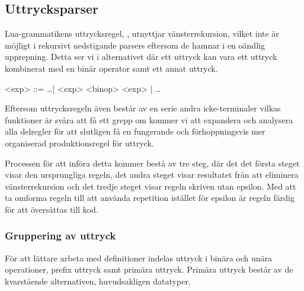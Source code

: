 \subsection{Uttrycksparser}

Lua-grammatikens uttrycksregel, , utnyttjar vänsterrekursion,
vilket inte är möjligt i rekursivt nedstigande parsers eftersom de hamnar i en
oändlig upprepning. Detta ser vi i alternativet där ett uttryck kan vara ett uttryck
kombinerat med en binär operator samt ett annat uttryck.


\setlength{\grammarindent}{5em}
\begin{grammar}
  \singlespace\small%
  \selectfont
  <exp> ::= \ldots | <exp> <binop> <exp> | \ldots
\end{grammar}

Eftersom uttrycksregeln även består av en serie andra icke-terminaler vilkas
funktioner är svåra att få ett grepp om kommer vi att expandera och analysera
alla delregler för att slutligen få en fungerande och förhoppningsvis mer
organiserad produktionsregel för uttryck.

Processen för att införa detta kommer bestå av tre steg, där det det första
steget visar den ursprungliga regeln, det andra steget visar resultatet från
att eliminera vänsterrekursion och det tredje steget visar regeln skriven utan epsilon.
Med att ta omforma regeln till att använda repetition istället för epsilon är
regeln färdig för att översättas till kod.

\subsubsection{Gruppering av uttryck}

För att lättare arbeta med definitioner indelas uttryck i binära och unära
operationer, prefix uttryck samt primära uttryck. Primära uttryck består av de
kvarstående alternativen, huvudsakligen datatyper.


